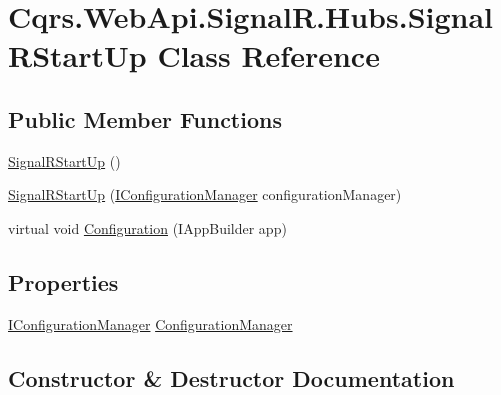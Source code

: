 \hypertarget{classCqrs_1_1WebApi_1_1SignalR_1_1Hubs_1_1SignalRStartUp}{}\section{Cqrs.\+Web\+Api.\+Signal\+R.\+Hubs.\+Signal\+R\+Start\+Up Class Reference}
\label{classCqrs_1_1WebApi_1_1SignalR_1_1Hubs_1_1SignalRStartUp}
\subsection*{Public Member Functions}
\begin{DoxyCompactItemize}
\item 
\hyperlink{classCqrs_1_1WebApi_1_1SignalR_1_1Hubs_1_1SignalRStartUp_a5d042d52b0c5671b7be52f69c05ec371}{Signal\+R\+Start\+Up} ()
\item 
\hyperlink{classCqrs_1_1WebApi_1_1SignalR_1_1Hubs_1_1SignalRStartUp_a52cbff947cf5da34dd8487c60ab85321}{Signal\+R\+Start\+Up} (\hyperlink{interfaceCqrs_1_1Configuration_1_1IConfigurationManager}{I\+Configuration\+Manager} configuration\+Manager)
\item 
virtual void \hyperlink{classCqrs_1_1WebApi_1_1SignalR_1_1Hubs_1_1SignalRStartUp_a0d670a1f640c6fd19edda463fe708879}{Configuration} (I\+App\+Builder app)
\end{DoxyCompactItemize}
\subsection*{Properties}
\begin{DoxyCompactItemize}
\item 
\hyperlink{interfaceCqrs_1_1Configuration_1_1IConfigurationManager}{I\+Configuration\+Manager} \hyperlink{classCqrs_1_1WebApi_1_1SignalR_1_1Hubs_1_1SignalRStartUp_a0c137e0c86431dc944d7a3415de011bb}{Configuration\+Manager}
\end{DoxyCompactItemize}


\subsection{Constructor \& Destructor Documentation}
\mbox{\label{classCqrs_1_1WebApi_1_1SignalR_1_1Hubs_1_1SignalRStartUp_a5d042d52b0c5671b7be52f69c05ec371}} 
